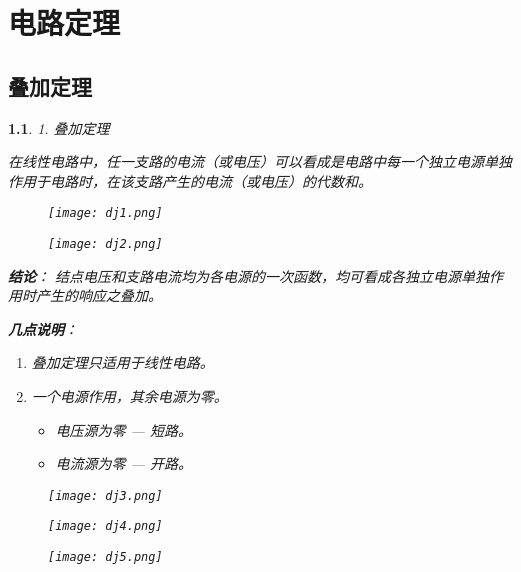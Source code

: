\documentclass[UTF8]{report}
\theoremstyle{MyLineTheoremStyle} %
\theoremstyle{MyBlockTheoremStyle} %
\theoremstyle{MySubsubsectionStyle} %
\newtheorem{definition}{}
\begin{document}
\chapter{电路定理}

\section{叠加定理}

\begin{definition}
    1. 叠加定理

    在线性电路中，任一支路的电流（或电压）可以看成是电路中每一个独立电源单独作用于电路时，在该支路产生的电流（或电压）的代数和。

    \begin{figure}[H]
        \centering
        \texttt{[image: dj1.png]}
    \end{figure}

    \begin{figure}[H]
        \centering
        \texttt{[image: dj2.png]}
    \end{figure}

    \textbf{结论}：
    结点电压和支路电流均为各电源的一次函数，均可看成各独立电源单独作用时产生的响应之叠加。

    \textbf{几点说明}：
    \begin{enumerate}
        \item 叠加定理只适用于线性电路。
        \item 一个电源作用，其余电源为零。
        \begin{itemize}
            \item 电压源为零 — 短路。
            \item 电流源为零 — 开路。
        \end{itemize}
    \end{enumerate}

    \begin{figure}[H]
        \centering
        \texttt{[image: dj3.png]}
    \end{figure}

    \begin{figure}[H]
        \centering
        \texttt{[image: dj4.png]}
    \end{figure}

    \begin{figure}[H]
        \centering
        \texttt{[image: dj5.png]}
    \end{figure}


\end{definition}
\end{document}
